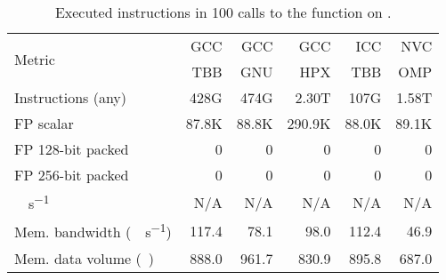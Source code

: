 \begin{table}[t]
	\centering
	\caption{Executed instructions in 100 calls to the function \groupfind on \machhydralong.}
	\label{tab:find-hw-counters}
	\begin{adjustbox}{max width=\linewidth}
	\begin{tabular}{lrrrrr}
		\toprule
		\multirow{2}{*}{Metric}                       & GCC   & GCC   & GCC    & ICC   & NVC   \\
		                                              & TBB   & GNU   & HPX    & TBB   & OMP   \\
		\midrule
		Instructions (any)                            & 428G  & 474G  & 2.30T  & 107G  & 1.58T \\
		FP scalar                                     & 87.8K & 88.8K & 290.9K & 88.0K & 89.1K \\
		FP 128-bit packed                             & 0     & 0     & 0      & 0     & 0     \\
		FP 256-bit packed                             & 0     & 0     & 0      & 0     & 0     \\
		\unit{\giga\FLOP\per\second}                  & N/A   & N/A   & N/A    & N/A   & N/A   \\
		Mem. bandwidth (\unit{\gibi\byte\per\second}) & 117.4 & 78.1  & 98.0   & 112.4 & 46.9  \\
		Mem. data volume (\unit{\gibi\byte})          & 888.0 & 961.7 & 830.9  & 895.8 & 687.0 \\
		\bottomrule
	\end{tabular}
	\end{adjustbox}
\end{table}


